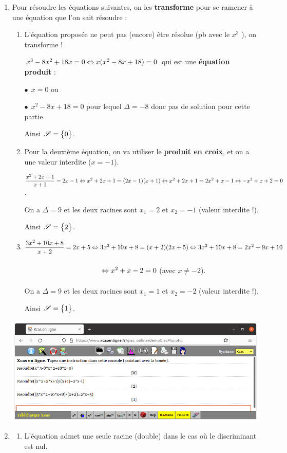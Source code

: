 \documentclass[a4paper,11pt]{article}
\begin{document}
\begin{enumerate}
	\item Pour résoudre les équations suivantes, on les \textbf{transforme} pour se ramener à une équation que l'on sait résoudre :
	\begin{enumerate}
		\item L'équation proposée ne peut pas (encore) être résolue (pb avec le \og $x^3$ \fg), on transforme !
		
		$x^3-8x^2+18x=0 \Leftrightarrow x(x^2-8x+18)=0$ qui est une \textbf{équation produit} :
		
		\hspace{5mm}$\bullet~~x=0$ ou
		
		\hspace{5mm}$\bullet~~x^2-8x+18=0$ pour lequel $\Delta=-8$ donc pas de solution pour cette \og partie \fg
		
		Ainsi $\mathscr{S}= \left\lbrace \strut 0 \right\rbrace$.
		\item Pour la deuxième équation, on va utiliser le \textbf{produit en croix}, et on a une valeur interdite ($x=-1$).
		
		$\dfrac{x^2+2x+1}{x+1}=2x-1 \Leftrightarrow x^2+2x+1 = (2x-1)(x+1) \Leftrightarrow x^2+2x+1 = 2x^2+x-1 \Leftrightarrow -x^2+x+2 = 0$.
		
		On a $\Delta=9$ et les deux racines sont $x_1=2$ et $x_2=-1$ (valeur interdite !).
		
		Ainsi $\mathscr{S}= \left\lbrace \strut 2 \right\rbrace$.
		\item $\dfrac{3x^2+10x+8}{x+2}=2x+5 \Leftrightarrow 3x^2+10x+8 = (x+2)(2x+5) \Leftrightarrow 3x^2+10x+8=2x^2+9x+10$
		
		$\phantom{\dfrac{3x^2+10x+8}{x+2}=2x+5} \ssi x^2+x-2=0$ (avec $x \neq -2$).
		
		On a $\Delta=9$ et les deux racines sont $x_1=1$ et $x_2=-2$ (valeur interdite !).
		
		Ainsi $\mathscr{S}= \left\lbrace \strut 1 \right\rbrace$.
	\end{enumerate}
	\begin{center}
		\includegraphics[scale=0.3]{chap01_exos_corr_e}
	\end{center}
	\item 
	\begin{enumerate}
		\item L'équation admet une seule racine (double) dans le cas où le discriminant est nul.
		

\end{enumerate}
\end{enumerate}
\end{document}
